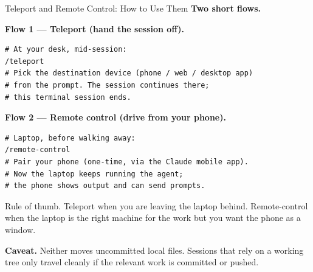 \documentclass[aspectratio=169, 11pt]{beamer}
\begin{document}
\begin{frame}[fragile]{Teleport and Remote Control: How to Use Them}
  \textbf{Two short flows.}

  \vspace{0.4em}
  \textbf{Flow 1 --- Teleport (hand the session off).}
  \begin{lstlisting}[basicstyle=\ttfamily\footnotesize]
# At your desk, mid-session:
/teleport
# Pick the destination device (phone / web / desktop app)
# from the prompt. The session continues there;
# this terminal session ends.
  \end{lstlisting}

  \vspace{0.3em}
  \textbf{Flow 2 --- Remote control (drive from your phone).}
  \begin{lstlisting}[basicstyle=\ttfamily\footnotesize]
# Laptop, before walking away:
/remote-control
# Pair your phone (one-time, via the Claude mobile app).
# Now the laptop keeps running the agent;
# the phone shows output and can send prompts.
  \end{lstlisting}

  \vspace{0.4em}
  {\small \alert{Rule of thumb.} Teleport when you are leaving the laptop behind. Remote-control when the laptop is the right machine for the work but you want the phone as a window.}

  \vspace{0.2em}
  {\small \textbf{Caveat.} Neither moves uncommitted local files. Sessions that rely on a working tree only travel cleanly if the relevant work is committed or pushed.}
\end{frame}

\end{document}
